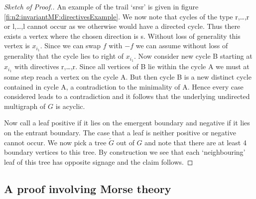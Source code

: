 \begin{proof}[Sketch of Proof.]
  An example of the trail `srsr' is given in figure \ref{fi:n2:invariantMF:directivesExample}.
  We now note that cycles of the type r,\dots,r or l,\dots,l
  cannot occur as we otherwise would have a directed cycle. Thus there exists a vertex where the chosen direction is s. 
  Without loss of generality this vertex is $x_{i_1}$.
  Since we can swap $f$ with $-f$ we can assume without loss of generality that the cycle lies to right of $x_{i_1}$.
  Now consider new cycle B starting at $x_{i_1}$ with directives r,\dots,r.
  Since all vertices of B lie within the cycle A we must at some step reach a vertex on the cycle A. But then cycle B is a new distinct cycle
  contained in cycle A, a contradiction to the minimality of A.
  Hence every case considered leads to a contradiction and it follows that the underlying undirected multigraph of $G$
  is acyclic.
  
  Now call a leaf positive if it lies on the emergent boundary and
  negative if it lies on the entrant boundary. The case that a leaf is neither positive or negative cannot occur.
  We now pick a tree $\widetilde{G}$ out of $G$ and note that
  there are at least 4 boundary vertices to this tree.
  By construction we see that each `neighbouring' leaf of this tree
  has opposite signage and the claim follows.
\end{proof}

\subsection{A proof involving Morse theory}

